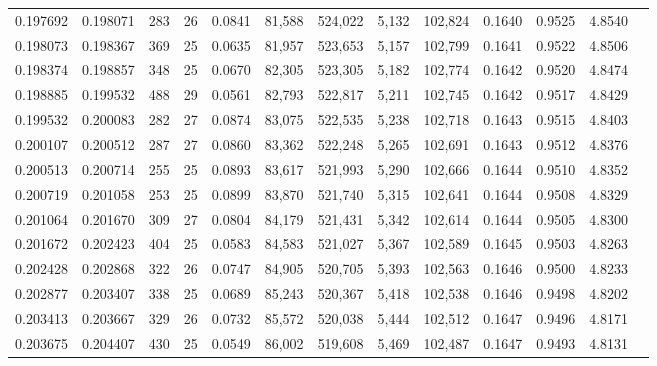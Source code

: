 \begin{tabular}{rrrrrrrrrrrrr}
0.197692 & 0.198071 &   283 &  26 &                                     0.0841 &  81,588 & 524,022 &   5,132 & 102,824 & 0.1640 & 0.9525 & 4.8540 \\
0.198073 & 0.198367 &   369 &  25 &                                     0.0635 &  81,957 & 523,653 &   5,157 & 102,799 & 0.1641 & 0.9522 & 4.8506 \\
0.198374 & 0.198857 &   348 &  25 &                                     0.0670 &  82,305 & 523,305 &   5,182 & 102,774 & 0.1642 & 0.9520 & 4.8474 \\
0.198885 & 0.199532 &   488 &  29 &                                     0.0561 &  82,793 & 522,817 &   5,211 & 102,745 & 0.1642 & 0.9517 & 4.8429 \\
0.199532 & 0.200083 &   282 &  27 &                                     0.0874 &  83,075 & 522,535 &   5,238 & 102,718 & 0.1643 & 0.9515 & 4.8403 \\
0.200107 & 0.200512 &   287 &  27 &                                     0.0860 &  83,362 & 522,248 &   5,265 & 102,691 & 0.1643 & 0.9512 & 4.8376 \\
0.200513 & 0.200714 &   255 &  25 &                                     0.0893 &  83,617 & 521,993 &   5,290 & 102,666 & 0.1644 & 0.9510 & 4.8352 \\
0.200719 & 0.201058 &   253 &  25 &                                     0.0899 &  83,870 & 521,740 &   5,315 & 102,641 & 0.1644 & 0.9508 & 4.8329 \\
0.201064 & 0.201670 &   309 &  27 &                                     0.0804 &  84,179 & 521,431 &   5,342 & 102,614 & 0.1644 & 0.9505 & 4.8300 \\
0.201672 & 0.202423 &   404 &  25 &                                     0.0583 &  84,583 & 521,027 &   5,367 & 102,589 & 0.1645 & 0.9503 & 4.8263 \\
0.202428 & 0.202868 &   322 &  26 &                                     0.0747 &  84,905 & 520,705 &   5,393 & 102,563 & 0.1646 & 0.9500 & 4.8233 \\
0.202877 & 0.203407 &   338 &  25 &                                     0.0689 &  85,243 & 520,367 &   5,418 & 102,538 & 0.1646 & 0.9498 & 4.8202 \\
0.203413 & 0.203667 &   329 &  26 &                                     0.0732 &  85,572 & 520,038 &   5,444 & 102,512 & 0.1647 & 0.9496 & 4.8171 \\
0.203675 & 0.204407 &   430 &  25 &                                     0.0549 &  86,002 & 519,608 &   5,469 & 102,487 & 0.1647 & 0.9493 & 4.8131 \\

\end{tabular}

